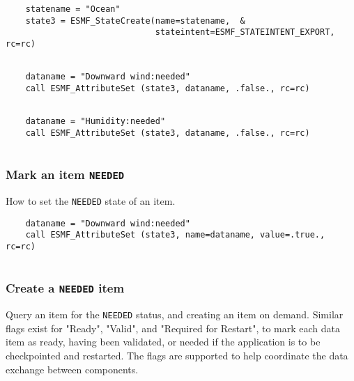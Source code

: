  \begin{verbatim}
    statename = "Ocean"
    state3 = ESMF_StateCreate(name=statename,  &
                              stateintent=ESMF_STATEINTENT_EXPORT, rc=rc)  
 
\end{verbatim}
 

 \begin{verbatim}
    dataname = "Downward wind:needed"
    call ESMF_AttributeSet (state3, dataname, .false., rc=rc)
 
\end{verbatim}
 

 \begin{verbatim}
    dataname = "Humidity:needed"
    call ESMF_AttributeSet (state3, dataname, .false., rc=rc)
 
\end{verbatim}
 

  \subsubsection{Mark an item {\tt NEEDED}}
     
   How to set the {\tt NEEDED} state of an item. 

 \begin{verbatim}
    dataname = "Downward wind:needed"
    call ESMF_AttributeSet (state3, name=dataname, value=.true., rc=rc)
 
\end{verbatim}
 

  \subsubsection{Create a {\tt NEEDED} item}
     
   Query an item for the {\tt NEEDED} status, and creating an item on demand.
   Similar flags exist for "Ready", "Valid", and "Required for Restart",
   to mark each data item as ready, having been validated, or needed if the
   application is to be checkpointed and restarted.  The flags are supported
   to help coordinate the data exchange between components. 

